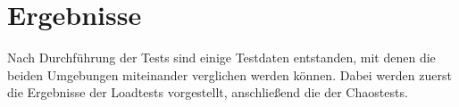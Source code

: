 \section{Ergebnisse}
Nach Durchführung der Tests sind einige Testdaten entstanden, mit denen die beiden Umgebungen miteinander verglichen werden können.
Dabei werden zuerst die Ergebnisse der Loadtests vorgestellt, anschließend die der Chaostests.


